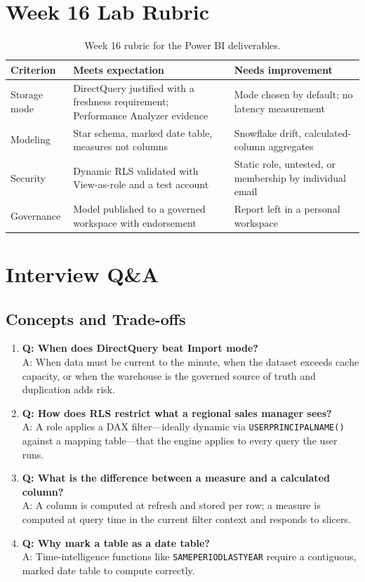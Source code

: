 \section{Week 16 Lab Rubric}
\begin{table}[H]
\centering
\small
\begin{tabular}{@{}p{3.2cm}p{5.0cm}p{5.0cm}@{}}
\toprule
\textbf{Criterion} & \textbf{Meets expectation} & \textbf{Needs improvement} \\
\midrule
Storage mode & DirectQuery justified with a freshness requirement; Performance Analyzer evidence & Mode chosen by default; no latency measurement \\
Modeling & Star schema, marked date table, measures not columns & Snowflake drift, calculated-column aggregates \\
Security & Dynamic RLS validated with View-as-role and a test account & Static role, untested, or membership by individual email \\
Governance & Model published to a governed workspace with endorsement & Report left in a personal workspace \\
\bottomrule
\end{tabular}
\caption{Week 16 rubric for the Power BI deliverables.}
\label{tab:ch16-rubric}
\end{table}

\section{Interview Q\&A}
\subsection{Concepts and Trade-offs}
\begin{enumerate}
    \item \textbf{Q: When does DirectQuery beat Import mode?}\\
    A: When data must be current to the minute, when the dataset exceeds cache capacity, or when the warehouse is the governed source of truth and duplication adds risk.
    \item \textbf{Q: How does RLS restrict what a regional sales manager sees?}\\
    A: A role applies a DAX filter---ideally dynamic via \texttt{USERPRINCIPALNAME()} against a mapping table---that the engine applies to every query the user runs.
    \item \textbf{Q: What is the difference between a measure and a calculated column?}\\
    A: A column is computed at refresh and stored per row; a measure is computed at query time in the current filter context and responds to slicers.
    \item \textbf{Q: Why mark a table as a date table?}\\
    A: Time-intelligence functions like \texttt{SAMEPERIODLASTYEAR} require a contiguous, marked date table to compute correctly.
\end{enumerate}

